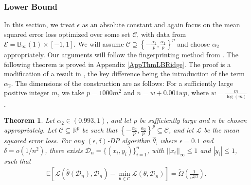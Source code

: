 \documentclass{article}
\newtheorem{theorem}{Theorem}
\begin{document}

\subsubsection{Lower Bound}
\label{sec:The Lower Bound}

In this section, we treat $\epsilon$ as an absolute constant and again focus on the mean squared error loss optimized over some set $\mathcal{C}$, with data from $\mathcal{E} = \mathbb{B}_{\infty}(1)\times [-1, 1]$. We will assume $\mathcal{C} \supseteq \left\{-\frac{\alpha_2}{p}, \frac{\alpha_2}{p}\right\}^p$ and choose $\alpha_2$ appropriately. Our arguments will follow the fingerprinting method from \cite{NOPL}.
The following theorem is proved in Appendix \ref{AppThmLBRidge}. The proof is a modification of a result in \cite{NOPL}, the key difference being the introduction of the term $\alpha_2$. The dimensions of the construction are as follows: For a sufficiently large positive integer $m$, we take $p = 1000m^2$ and $n = w + 0.001wp$, where $w = \frac{m}{\log(m)}$.

\begin{theorem}
\label{theorem:LBRidge}
Let $\alpha_2 \in (0.993, 1)$, and let $p$ be sufficiently large and $n$ be chosen appropriately. Let $\mathcal{C} \subseteq \mathbb{R}^p$ be such that $\left\{-\frac{\alpha_2}{p}, \frac{\alpha_2}{p}\right\}^p \subseteq \mathcal{C}$, and let $\mathcal{L}$ be the mean squared error loss. For any $(\epsilon, \delta)$-DP algorithm $\hat{\theta}$, where $\epsilon = 0.1$ and $\delta = o(1/n^2)$, there exists $\mathcal{D}_n = \{(x_i, y_i)\}_{i = 1}^n$, with $||x_i||_{\infty} \leq 1$ and $|y_i| \leq 1$, such that 
\begin{align*}
\mathbb{E}\left[\mathcal{L}(\hat{\theta}(\mathcal{D}_n), \mathcal{D}_n) - \mathop{\min}\limits_{\theta \in \mathcal{C}}\mathcal{L}(\theta, \mathcal{D}_n)\right] = \widetilde{\Omega}\left(\frac{1}{n^{2/3}}\right).
\end{align*}
\end{theorem}
\end{document}
